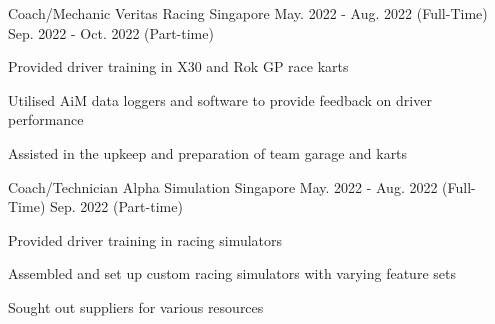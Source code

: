 

\begin{cventries}

  \cventry
    {Coach/Mechanic} %
    {Veritas Racing} %
    {Singapore} %
    {May. 2022 - Aug. 2022 (Full-Time)}
    {Sep. 2022 - Oct. 2022 (Part-time)} %
    {
      \begin{cvitems} %
        \item {Provided driver training in X30 and Rok GP race karts}
        \item {Utilised AiM data loggers and software to provide feedback on driver performance}
        \item {Assisted in the upkeep and preparation of team garage and karts}
      \end{cvitems}
    }

  \cventry
    {Coach/Technician} %
    {Alpha Simulation} %
    {Singapore} %
    {May. 2022 - Aug. 2022 (Full-Time)}
    {Sep. 2022 (Part-time)} %
    {
      \begin{cvitems} %
        \item {Provided driver training in racing simulators}
        \item {Assembled and set up custom racing simulators with varying feature sets}
        \item {Sought out suppliers for various resources}
      \end{cvitems}
    }



\end{cventries}
